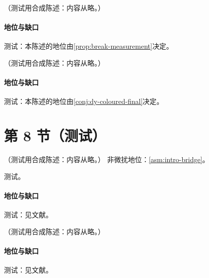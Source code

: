 \begin{conjecture}\label{conj:dy-coloured-final}
（测试用合成陈述：内容从略。）
\end{conjecture}
\paragraph{地位与缺口}测试：本陈述的地位由\cref{prop:break-measurement}决定。

\begin{conjecture}\label{conj:dy-polarized-jets}
（测试用合成陈述：内容从略。）
\end{conjecture}
\paragraph{地位与缺口}测试：本陈述的地位由\cref{conj:dy-coloured-final}决定。

\section{第 8 节（测试）}\label{sec:dy-other}

\begin{theorem}\label{thm:dy-higher-twist}
（测试用合成陈述：内容从略。）
非微扰地位：\cref{asm:intro-bridge}。
\end{theorem}
\begin{proofsketch}测试。\end{proofsketch}
\paragraph{地位与缺口}测试：见文献。

\begin{proposition}\label{prop:dy-twist6-failure}
（测试用合成陈述：内容从略。）
\end{proposition}
\paragraph{地位与缺口}测试：见文献。
